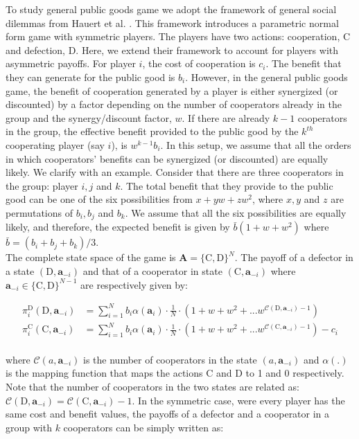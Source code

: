 \documentclass[11pt]{article}
\theoremstyle{plainCl1}
\theoremstyle{plainCl2}
\newcommand{\A}{\mathbf{A}}
\newcommand{\abf}{\mathbf{a}}
\newcommand{\C}{\mathrm{C}}
\newcommand{\D}{\mathrm{D}}
\begin{document}
To study general public goods game we adopt the framework of general social dilemmas from Hauert et al. \cite{Hauert:JTB:2006a}. This framework introduces a parametric normal form game with symmetric players. The players have two actions: cooperation, $\C$ and defection, $\D$. Here, we extend their framework to account for players with asymmetric payoffs. For player $i$, the cost of cooperation is $c_i$. The benefit that they can generate for the public good is $b_i$. However, in the general public goods game, the benefit of cooperation generated by a player is either synergized (or discounted) by a factor depending on the number of cooperators already in the group and the synergy/discount factor, $w$. If there are already $k-1$ cooperators in the group, the effective benefit provided to the public good by the $k^{th}$ cooperating player (say $i$), is $w^{k-1} b_i$. In this setup, we assume that all the orders in which cooperators' benefits can be synergized (or discounted) are equally likely. We clarify with an example. Consider that there are three cooperators in the group: player $i, j$ and $k$. The total benefit that they provide to the public good can be one of the six possibilities from $x + y w + z w^2$, where $x,y$ and $z$ are permutations  of $b_i, b_j$ and $b_k$. We assume that all the six possibilities are equally likely, and therefore, the expected benefit is given by $\bar{b}(1 + w + w^2)$ where $\bar{b} = (b_i + b_j + b_k)/3$. \\ 

\noindent The complete state space of the game is $\A = \{\C,\D\}^N$. The payoff of a defector in a state $(\D, \abf_{-i})$ and that of a cooperator in state $(\C,\abf_{-i})$ where $\abf_{-i} \in \{\C,\D\}^{N-1}$ are respectively given by:

\begin{align}
\pi^{\D}_i(\D, \abf_{-i})&= \displaystyle \sum_{i=1}^N b_i \alpha(\abf_i) \cdot \frac{1}{N} \cdot \left(1 + w + w^2 + ...w^{\mathcal{C}(\D,\abf_{-i}) - 1} \right)\\[15pt]
\pi^{\C}_i(\C, \abf_{-i}) &= \displaystyle \sum_{i=1}^N b_i \alpha(\abf_i) \cdot \frac{1}{N} \cdot \left(1 + w + w^2 + ...w^{\mathcal{C}(\C,\abf_{-i}) - 1} \right) - c_i
\label{Eq:payoff-synergistic-asymmetric}
\end{align} \\
\noindent where $\mathcal{C}(a,\abf_{-i})$ is the number of cooperators in the state $(a,\abf_{-i})$ and $\alpha(.)$ is the mapping function that maps the actions $\C$ and $\D$ to 1 and 0 respectively. Note that the number of cooperators in the two states are related as: $\mathcal{C}(\D,\abf_{-i}) = \mathcal{C}(\C,\abf_{-i}) - 1$. In the symmetric case, were every player has the same cost and benefit values, the payoffs of a defector and a cooperator in a group with $k$ cooperators can be simply written as:
\end{document}

